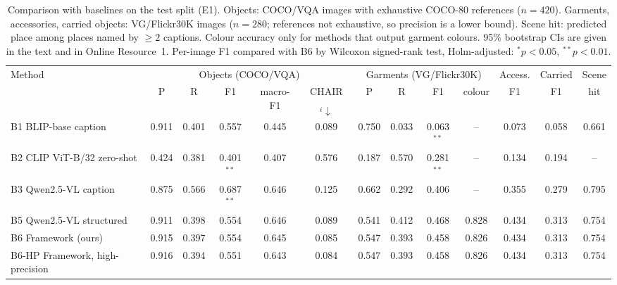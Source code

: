 \begin{table}[!t]
\centering
\footnotesize
\caption{Comparison with baselines on the test split (E1). Objects: COCO/VQA images with exhaustive COCO-80 references ($n=420$). Garments, accessories, carried objects: VG/Flickr30K images ($n=280$; references not exhaustive, so precision is a lower bound). Scene hit: predicted place among places named by $\geq2$ captions. Colour accuracy only for methods that output garment colours. 95\% bootstrap CIs are given in the text and in Online Resource~1. Per-image F1 compared with B6 by Wilcoxon signed-rank test, Holm-adjusted: $^{*}p<0.05$, $^{**}p<0.01$.}
\label{tab:comparison}
\begin{adjustbox}{max width=\textwidth}
\begin{tabular}{lcccccccccccc}
\toprule
\multirow{2}{*}{Method} & \multicolumn{5}{c}{Objects (COCO/VQA)} & \multicolumn{4}{c}{Garments (VG/Flickr30K)} & Access. & Carried & Scene \\ \cmidrule(lr){2-6}\cmidrule(lr){7-10} & P & R & F1 & macro-F1 & CHAIR$_i\downarrow$ & P & R & F1 & colour & F1 & F1 & hit \\
\midrule
B1 BLIP-base caption & 0.911 & 0.401 & 0.557 & 0.445 & 0.089 & 0.750 & 0.033 & 0.063$^{**}$ & -- & 0.073 & 0.058 & 0.661 \\
B2 CLIP ViT-B/32 zero-shot & 0.424 & 0.381 & 0.401$^{**}$ & 0.407 & 0.576 & 0.187 & 0.570 & 0.281$^{**}$ & -- & 0.134 & 0.194 & -- \\
B3 Qwen2.5-VL caption & 0.875 & 0.566 & 0.687$^{**}$ & 0.646 & 0.125 & 0.662 & 0.292 & 0.406 & -- & 0.355 & 0.279 & 0.795 \\
B5 Qwen2.5-VL structured & 0.911 & 0.398 & 0.554 & 0.646 & 0.089 & 0.541 & 0.412 & 0.468 & 0.828 & 0.434 & 0.313 & 0.754 \\
B6 Framework (ours) & 0.915 & 0.397 & 0.554 & 0.645 & 0.085 & 0.547 & 0.393 & 0.458 & 0.826 & 0.434 & 0.313 & 0.754 \\
B6-HP Framework, high-precision & 0.916 & 0.394 & 0.551 & 0.643 & 0.084 & 0.547 & 0.393 & 0.458 & 0.826 & 0.434 & 0.313 & 0.754 \\
\bottomrule
\end{tabular}
\end{adjustbox}
\end{table}
